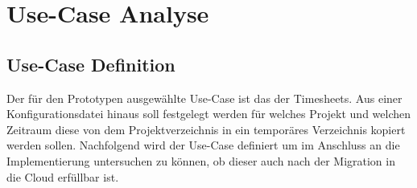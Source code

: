 \section{Use-Case Analyse}


\subsection{Use-Case Definition}
Der für den Prototypen ausgewählte Use-Case ist das \grqq der Timesheets. Aus einer Konfigurationsdatei hinaus soll festgelegt werden für welches Projekt und welchen Zeitraum diese von dem Projektverzeichnis in ein temporäres Verzeichnis kopiert werden sollen. Nachfolgend wird der Use-Case definiert um im Anschluss an die Implementierung untersuchen zu können, ob dieser auch nach der Migration in die Cloud erfüllbar ist. %
